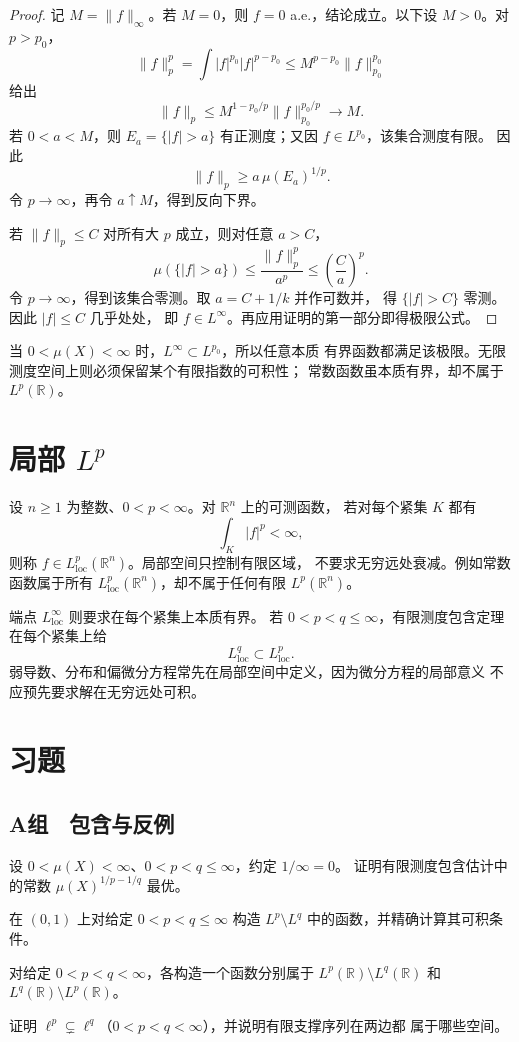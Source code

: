 \begin{proof}
记 \(M=\|f\|_\infty\)。若 \(M=0\)，则 \(f=0\) a.e.，结论成立。以下设
\(M>0\)。对 \(p>p_0\)，
\[
 \|f\|_p^p
 =\int |f|^{p_0}|f|^{p-p_0}
 \le M^{p-p_0}\|f\|_{p_0}^{p_0}
\]
给出
\[
 \|f\|_p
 \le M^{1-p_0/p}\|f\|_{p_0}^{p_0/p}
 \longrightarrow M.
\]
若 \(0<a<M\)，则
\(E_a=\{|f|>a\}\) 有正测度；又因 \(f\in L^{p_0}\)，该集合测度有限。
因此
\[
 \|f\|_p\ge a\,\mu(E_a)^{1/p}.
\]
令 \(p\to\infty\)，再令 \(a\uparrow M\)，得到反向下界。

若 \(\|f\|_p\le C\) 对所有大 \(p\) 成立，则对任意 \(a>C\)，
\[
 \mu(\{|f|>a\})\le\frac{\|f\|_p^p}{a^p}
 \le\left(\frac Ca\right)^p.
\]
令 \(p\to\infty\)，得到该集合零测。取 \(a=C+1/k\) 并作可数并，
得 \(\{|f|>C\}\) 零测。因此 \(|f|\le C\) 几乎处处，
即 \(f\in L^\infty\)。再应用证明的第一部分即得极限公式。
\end{proof}

当 \(0<\mu(X)<\infty\) 时，\(L^\infty\subset L^{p_0}\)，所以任意本质
有界函数都满足该极限。无限测度空间上则必须保留某个有限指数的可积性；
常数函数虽本质有界，却不属于 \(L^p(\mathbb R)\)。

\section{局部 \texorpdfstring{\(L^p\)}{Lp}}

设 \(n\ge1\) 为整数、\(0<p<\infty\)。对 \(\mathbb R^n\) 上的可测函数，
若对每个紧集 \(K\) 都有
\[
 \int_K|f|^p<\infty,
\]
则称 \(f\in L^p_{\mathrm{loc}}(\mathbb R^n)\)。局部空间只控制有限区域，
不要求无穷远处衰减。例如常数函数属于所有
\(L^p_{\mathrm{loc}}(\mathbb R^n)\)，却不属于任何有限
\(L^p(\mathbb R^n)\)。

端点 \(L^\infty_{\mathrm{loc}}\) 则要求在每个紧集上本质有界。
若 \(0<p<q\le\infty\)，有限测度包含定理在每个紧集上给
\[
 L^q_{\mathrm{loc}}\subset L^p_{\mathrm{loc}}.
\]
弱导数、分布和偏微分方程常先在局部空间中定义，因为微分方程的局部意义
不应预先要求解在无穷远处可积。

\section*{习题}
\subsection*{A组　包含与反例}
\begin{enumerate}[label=\textbf{\thechapter.\arabic*.}]
设 \(0<\mu(X)<\infty\)、\(0<p<q\le\infty\)，约定 \(1/\infty=0\)。
证明有限测度包含估计中的常数
\(\mu(X)^{1/p-1/q}\) 最优。

在 \((0,1)\) 上对给定 \(0<p<q\le\infty\) 构造
\(L^p\setminus L^q\) 中的函数，并精确计算其可积条件。

对给定 \(0<p<q<\infty\)，各构造一个函数分别属于
\(L^p(\mathbb R)\setminus L^q(\mathbb R)\) 和
\(L^q(\mathbb R)\setminus L^p(\mathbb R)\)。

证明 \(\ell^p\subsetneq\ell^q\)（\(0<p<q<\infty\)），并说明有限支撑序列在两边都
属于哪些空间。

\end{enumerate}

